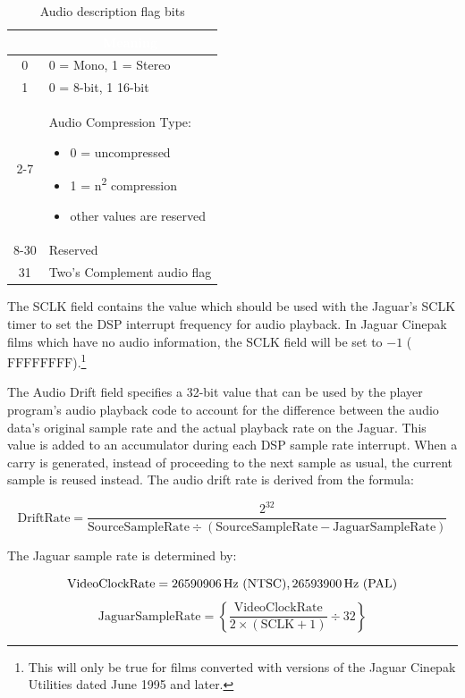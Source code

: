 \documentclass[12pt,letterpaper,twoside]{article}
\newcommand{\tabheadtxt}[1]{\multicolumn{1}{c}{\textcolor{white}{\textbf{#1}}}}
\begin{document}
\begin{table}[h]
\centering
\begin{tabular}{|c|p{8cm}|}
\hline
\rowcolor{black}
\tabheadtxt{Bits} & \tabheadtxt{Meaning}\\
\hline
0 & 0 = Mono, 1 = Stereo\\
\hline
1 & 0 = 8-bit, 1 16-bit\\
\hline
2-7 & Audio Compression Type:
\newline
	\begin{itemize}[nosep]
	\item[] 0 = uncompressed
	\item[]	1 = n\textsuperscript{2} compression
	\item[] other values are reserved 
	\end{itemize}\\
\hline
8-30 & Reserved\\
\hline
31 & Two's Complement audio flag\\
\hline
\end{tabular}
\caption{Audio description flag bits}
\label{tab:audioflags}
\end{table}
\FloatBarrier

The SCLK field contains the value which should be used with the Jaguar's SCLK 
timer to set the DSP interrupt frequency for audio playback. In Jaguar Cinepak
films which have no audio information, the SCLK field will be set to $-1$
($\mathrm{FFFFFFFF}$).\footnote{This will only be true for films converted with versions of the Jaguar Cinepak Utilities dated June 1995 and later.}

The Audio Drift field specifies a 32-bit value that can be used by the player program's audio playback code to account for the difference between the audio data's original sample rate and the actual playback rate on the Jaguar. This value is added to an accumulator during each DSP sample rate interrupt. When a carry is generated, instead of proceeding to the next sample as usual, the current sample is reused instead. The audio drift rate is derived from the formula: 

\begin{equation}
\mathrm{DriftRate} = \frac{2^{32}}{\mathrm{SourceSampleRate} \div (\mathrm{SourceSampleRate} - \mathrm{JaguarSampleRate})}
\end{equation}

The Jaguar sample rate is determined by: 

\begin{equation}
\mathrm{VideoClockRate} = 26590906\,\mathrm{Hz} \text{ (NTSC)}, 26593900\,\mathrm{Hz} \text{ (PAL)} \\
\end{equation}
\begin{equation}
\mathrm{JaguarSampleRate} = \left\{\frac{\mathrm{VideoClockRate}}{2 \times (\mathrm{SCLK} + 1)} \div 32\right\}
\end{equation}
\end{document}
